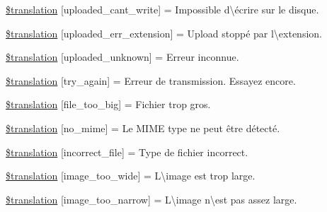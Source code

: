 \begin{DoxyCompactItemize}
\item 
\hyperlink{class_8upload_8fr___f_r_8php_af368fee3b41bc05e6b208c1557a00c00}{\$translation} \mbox{[}\textquotesingle{}uploaded\+\_\+cant\+\_\+write\textquotesingle{}\mbox{]} = \textquotesingle{}Impossible d\textbackslash{}\textquotesingle{}écrire sur le disque.\textquotesingle{}
\item 
\hyperlink{class_8upload_8fr___f_r_8php_a01c69a4c8556602b3892dce727bace11}{\$translation} \mbox{[}\textquotesingle{}uploaded\+\_\+err\+\_\+extension\textquotesingle{}\mbox{]} = \textquotesingle{}Upload stoppé par l\textbackslash{}\textquotesingle{}extension.\textquotesingle{}
\item 
\hyperlink{class_8upload_8fr___f_r_8php_a4a9168e922b827e6a28b5db1c00774ca}{\$translation} \mbox{[}\textquotesingle{}uploaded\+\_\+unknown\textquotesingle{}\mbox{]} = \textquotesingle{}Erreur inconnue.\textquotesingle{}
\item 
\hyperlink{class_8upload_8fr___f_r_8php_a3afc377bd803683314f413a814243066}{\$translation} \mbox{[}\textquotesingle{}try\+\_\+again\textquotesingle{}\mbox{]} = \textquotesingle{}Erreur de transmission. Essayez encore.\textquotesingle{}
\item 
\hyperlink{class_8upload_8fr___f_r_8php_a476278eb4a0c3df56af068e2d511a741}{\$translation} \mbox{[}\textquotesingle{}file\+\_\+too\+\_\+big\textquotesingle{}\mbox{]} = \textquotesingle{}Fichier trop gros.\textquotesingle{}
\item 
\hyperlink{class_8upload_8fr___f_r_8php_a191a55df8e3bb7f3c51b70f3c1932e02}{\$translation} \mbox{[}\textquotesingle{}no\+\_\+mime\textquotesingle{}\mbox{]} = \textquotesingle{}Le M\+I\+M\+E type ne peut être détecté.\textquotesingle{}
\item 
\hyperlink{class_8upload_8fr___f_r_8php_a4d32343e2699edd6fd435f9c832cb9c7}{\$translation} \mbox{[}\textquotesingle{}incorrect\+\_\+file\textquotesingle{}\mbox{]} = \textquotesingle{}Type de fichier incorrect.\textquotesingle{}
\item 
\hyperlink{class_8upload_8fr___f_r_8php_a0dd3e4930ca1f59ae280f4b1006525cd}{\$translation} \mbox{[}\textquotesingle{}image\+\_\+too\+\_\+wide\textquotesingle{}\mbox{]} = \textquotesingle{}L\textbackslash{}\textquotesingle{}image est trop large.\textquotesingle{}
\item 
\hyperlink{class_8upload_8fr___f_r_8php_a5c9a4cd67fd21c32e0a3b434591a6037}{\$translation} \mbox{[}\textquotesingle{}image\+\_\+too\+\_\+narrow\textquotesingle{}\mbox{]} = \textquotesingle{}L\textbackslash{}\textquotesingle{}image n\textbackslash{}est pas assez large.\textquotesingle{}

\end{DoxyCompactItemize}
